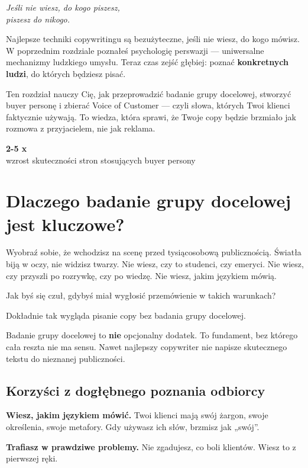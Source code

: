 \documentclass[
  12pt,
  a4paper,
  twoside,
  openright,
  12pt,
  DIV=12,
  BCOR=12mm]{scrbook}
\newcommand{\chapteropener}[1]{%
  \begin{center}
    \large\itshape\color{textmuted}#1
  \end{center}
  \vspace{1em}
}
\newcommand{\stathighlight}[2]{%
  \begin{center}
    \begin{tcolorbox}[
      enhanced,
      colback=primarylight,
      colframe=primaryblue,
      boxrule=1pt,
      arc=5pt,
      width=0.6\textwidth,
      halign=center
    ]
      {\fontsize{36}{40}\selectfont\bfseries\color{primarydark}#1}\\[5pt]
      {\color{textmuted}#2}
    \end{tcolorbox}
  \end{center}
}
\begin{document}
\chapteropener{Jeśli nie wiesz, do kogo piszesz,\\piszesz do nikogo.}

Najlepsze techniki copywritingu są bezużyteczne, jeśli nie wiesz, do
kogo mówisz. W poprzednim rozdziale poznałeś psychologię perswazji ---
uniwersalne mechanizmy ludzkiego umysłu. Teraz czas zejść głębiej:
poznać \textbf{konkretnych ludzi}, do których będziesz pisać.

Ten rozdział nauczy Cię, jak przeprowadzić badanie grupy docelowej,
stworzyć buyer personę i zbierać Voice of Customer --- czyli słowa,
których Twoi klienci faktycznie używają. To wiedza, która sprawi, że
Twoje copy będzie brzmiało jak rozmowa z przyjacielem, nie jak reklama.

\stathighlight{2-5 x}{wzrost skuteczności stron stosujących buyer persony}

\section{Dlaczego badanie grupy docelowej jest
kluczowe?}\label{dlaczego-badanie-grupy-docelowej-jest-kluczowe}

Wyobraź sobie, że wchodzisz na scenę przed tysiącosobową publicznością.
Światła biją w oczy, nie widzisz twarzy. Nie wiesz, czy to studenci, czy
emeryci. Nie wiesz, czy przyszli po rozrywkę, czy po wiedzę. Nie wiesz,
jakim językiem mówią.

Jak byś się czuł, gdybyś miał wygłosić przemówienie w takich warunkach?

Dokładnie tak wygląda pisanie copy bez badania grupy docelowej.

\begin{wazne}
Badanie grupy docelowej to \textbf{nie} opcjonalny dodatek. To fundament, bez którego cała reszta nie ma sensu. Nawet najlepszy copywriter nie napisze skutecznego tekstu do nieznanej publiczności.
\end{wazne}

\subsection{Korzyści z dogłębnego poznania
odbiorcy}\label{korzyux15bci-z-dogux142ux119bnego-poznania-odbiorcy}

\textbf{Wiesz, jakim językiem mówić.} Twoi klienci mają swój żargon,
swoje określenia, swoje metafory. Gdy używasz ich słów, brzmisz jak
„swój''.

\textbf{Trafiasz w prawdziwe problemy.} Nie zgadujesz, co boli klientów.
Wiesz to z pierwszej ręki.
\end{document}
